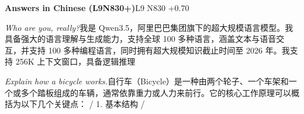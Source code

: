 \begin{multicols}{2}
\noindent\textbf{Answers in Chinese (L9N830+)}\hfill{\ttfamily L9 N830 +0.70}\par\noindent\textit{Who are you, really?}\enspace 我\allowbreak{}是\allowbreak{} Qwen3.5，\allowbreak{}阿\allowbreak{}里\allowbreak{}\allowbreak{}巴\allowbreak{}巴\allowbreak{}集\allowbreak{}团\allowbreak{}旗\allowbreak{}下\allowbreak{}的\allowbreak{}超\allowbreak{}大\allowbreak{}规\allowbreak{}\allowbreak{}模\allowbreak{}语\allowbreak{}言\allowbreak{}模\allowbreak{}型\allowbreak{}。\allowbreak{}我\allowbreak{}具\allowbreak{}备\allowbreak{}强\allowbreak{}\allowbreak{}大\allowbreak{}的\allowbreak{}语\allowbreak{}言\allowbreak{}理\allowbreak{}解\allowbreak{}与\allowbreak{}生\allowbreak{}成\allowbreak{}能\allowbreak{}\allowbreak{}力\allowbreak{}，\allowbreak{}支\allowbreak{}持\allowbreak{}全\allowbreak{}球\allowbreak{} 100 多\allowbreak{}种\allowbreak{}语\allowbreak{}言\allowbreak{}，\allowbreak{}涵\allowbreak{}盖\allowbreak{}文\allowbreak{}本\allowbreak{}与\allowbreak{}语\allowbreak{}音\allowbreak{}交\allowbreak{}互\allowbreak{}，\allowbreak{}并\allowbreak{}支\allowbreak{}持\allowbreak{} 100 多\allowbreak{}种\allowbreak{}编\allowbreak{}程\allowbreak{}语\allowbreak{}言\allowbreak{}，\allowbreak{}同\allowbreak{}时\allowbreak{}拥\allowbreak{}有\allowbreak{}超\allowbreak{}大\allowbreak{}规\allowbreak{}模\allowbreak{}知\allowbreak{}识\allowbreak{}截\allowbreak{}止\allowbreak{}时\allowbreak{}间\allowbreak{}至\allowbreak{} 2026 年\allowbreak{}。\allowbreak{}我\allowbreak{}支\allowbreak{}持\allowbreak{} 256K 上\allowbreak{}下\allowbreak{}文\allowbreak{}窗\allowbreak{}口\allowbreak{}，\allowbreak{}具\allowbreak{}备\allowbreak{}逻\allowbreak{}辑\allowbreak{}推\allowbreak{}理\allowbreak{}\par\noindent\textit{Explain how a bicycle works.}\enspace 自\allowbreak{}行\allowbreak{}车\allowbreak{}（\allowbreak{}Bicycl\allowbreak{}e）\allowbreak{}是\allowbreak{}一\allowbreak{}种\allowbreak{}由\allowbreak{}两\allowbreak{}个\allowbreak{}轮\allowbreak{}子\allowbreak{}\allowbreak{}、\allowbreak{}一\allowbreak{}个\allowbreak{}车\allowbreak{}架\allowbreak{}和\allowbreak{}一\allowbreak{}个\allowbreak{}或\allowbreak{}多\allowbreak{}\allowbreak{}个\allowbreak{}踏\allowbreak{}板\allowbreak{}组\allowbreak{}成\allowbreak{}的\allowbreak{}车\allowbreak{}辆\allowbreak{}，\allowbreak{}通\allowbreak{}\allowbreak{}常\allowbreak{}依\allowbreak{}靠\allowbreak{}重\allowbreak{}力\allowbreak{}或\allowbreak{}人\allowbreak{}力\allowbreak{}来\allowbreak{}前\allowbreak{}\allowbreak{}行\allowbreak{}。\allowbreak{}它\allowbreak{}的\allowbreak{}核\allowbreak{}心\allowbreak{}工\allowbreak{}作\allowbreak{}原\allowbreak{}理\allowbreak{}\allowbreak{}可\allowbreak{}以\allowbreak{}概\allowbreak{}括\allowbreak{}为\allowbreak{}以\allowbreak{}下\allowbreak{}几\allowbreak{}个\allowbreak{}关\allowbreak{}\allowbreak{}键\allowbreak{}点\allowbreak{}：\allowbreak{} / 1. 基\allowbreak{}本\allowbreak{}结\allowbreak{}构\allowbreak{} / 
\end{multicols}
